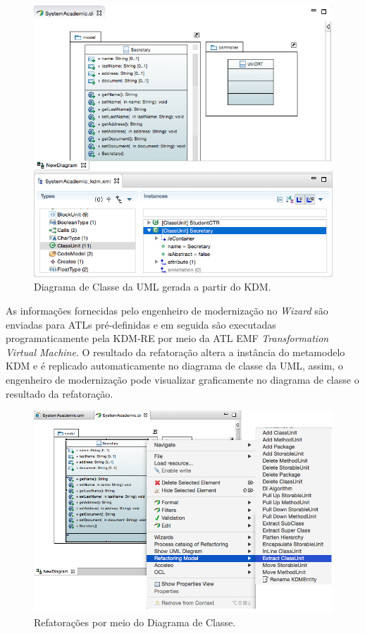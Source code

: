\begin{figure}[!h]
	\centering
	\caption{Diagrama de Classe da UML gerada a partir do KDM.}
	\label{fig:kdmToUML_diagrama_de_classe}
	\includegraphics[scale=0.5]{images/refatoracao_UML_papyrus}
	\fautor
\end{figure}

As informações fornecidas pelo engenheiro de modernização no \textit{Wizard} são enviadas para ATLs pré-definidas e em seguida são executadas programaticamente pela KDM-RE por meio da ATL EMF \textit{Transformation Virtual Machine}. O resultado da refatoração altera a instância do metamodelo KDM e é replicado automaticamente no diagrama de classe da UML, assim, o engenheiro de modernização pode visualizar graficamente no diagrama de classe o resultado da refatoração.

\begin{figure}[!h]
	\centering
	\caption{Refatorações por meio do Diagrama de Classe.}
	\label{fig:refatoracao_papyrus_KDM_iteragir}
	\includegraphics[scale=0.5]{images/kdm_uml_papyrus_refactoring_extract_class_new}
	\fautor
\end{figure}

